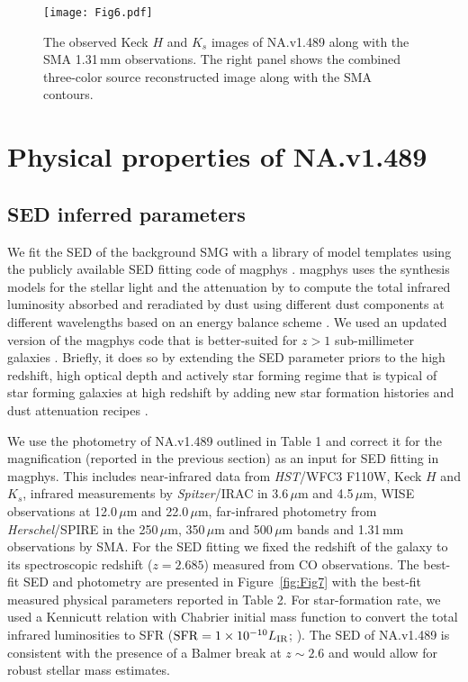 \documentclass[iop,apj,useAMS,usenatbib]{emulateapj-rtx4}
\begin{document}
\begin{figure*}
\centering
\leavevmode
\texttt{[image: Fig6.pdf]}
\caption{The observed Keck $H$ and $K_s$ images of NA.v1.489 along
  with the SMA 1.31\,mm observations. The right panel shows the
  combined three-color source reconstructed image along with the SMA contours.}
\label{fig:Fig6}
\end{figure*}

\section{Physical properties of NA.v1.489}

\subsection{SED inferred parameters}

We fit the SED of the background SMG with a library of model templates using the publicly
available SED fitting code of {\sc magphys} \citep{Cunha2008}. {\sc magphys} uses the
\citet{Bruzual2003} synthesis models for the stellar light and the
attenuation by \citet{Charlot2000} to compute the total infrared
luminosity absorbed and reradiated by dust using different dust
components at different wavelengths based on an energy balance scheme
\citep{Cunha2008}. We used an updated version of the {\sc magphys} code that
is better-suited for $z>1$ sub-millimeter galaxies \citep
{Cunha2015}. Briefly, it does so by extending the SED parameter priors to the high redshift,
high optical depth and actively star forming regime that is typical of
star forming galaxies at high redshift by adding new star formation
histories and dust attenuation recipes \citep{Cunha2015}.
 
We use the photometry of NA.v1.489 outlined in Table 1 and correct
it for the magnification (reported in the previous section) as an input for SED
fitting in {\sc magphys}. This includes near-infrared data from {\it
  HST}/WFC3 F110W, Keck $H$ and $K_s$,
infrared measurements by {\it Spitzer}/IRAC in 3.6\,$\mu$m and
4.5\,$\mu$m, WISE observations at 12.0\,$\mu$m and 22.0\,$\mu$m,
far-infrared photometry from {\it Herschel}/SPIRE in the 250\,$\mu$m,
350\,$\mu$m and 500\,$\mu$m bands and 1.31\,mm observations by
SMA. For the SED fitting we fixed the redshift of the galaxy to its
spectroscopic redshift ($z=2.685$) measured from CO observations. The
best-fit SED and photometry are presented in
Figure~\ref{fig:Fig7} with the best-fit measured physical parameters
reported in Table 2. For star-formation rate, we used a Kennicutt
relation \citep{Kennicutt1998} with Chabrier initial mass function
\citep{Chabrier2003} to convert the total
infrared luminosities to SFR (${\rm SFR}=1\times10^{-10}L_{\rm IR}$;
\citealp{Riechers2013}). The SED of NA.v1.489 is consistent with the presence of a
Balmer break at $z\sim2.6$ and would allow for robust
stellar mass estimates.
\end{document}
